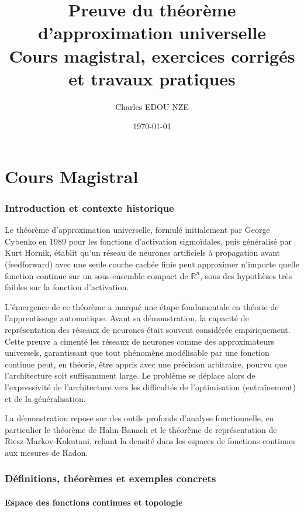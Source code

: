 \documentclass[11pt,a4paper]{article}
\title{\Huge Preuve du théorème d'approximation universelle \\ \large Cours magistral, exercices corrigés et travaux pratiques}
\author{\Large Charles EDOU NZE}
\date{\today}
\begin{document}
\maketitle
\tableofcontents
\newpage

\part{Cours Magistral}

\section{Introduction et contexte historique}

Le théorème d'approximation universelle, formulé initialement par George Cybenko en 1989 pour les fonctions d'activation sigmoïdales, puis généralisé par Kurt Hornik, établit qu'un réseau de neurones artificiels à propagation avant (feedforward) avec une seule couche cachée finie peut approximer n'importe quelle fonction continue sur un sous-ensemble compact de $\mathbb{R}^n$, sous des hypothèses très faibles sur la fonction d'activation.

L'émergence de ce théorème a marqué une étape fondamentale en théorie de l'apprentissage automatique. Avant sa démonstration, la capacité de représentation des réseaux de neurones était souvent considérée empiriquement. Cette preuve a cimenté les réseaux de neurones comme des approximateurs universels, garantissant que tout phénomène modélisable par une fonction continue peut, en théorie, être appris avec une précision arbitraire, pourvu que l'architecture soit suffisamment large. Le problème se déplace alors de l'expressivité de l'architecture vers les difficultés de l'optimisation (entraînement) et de la généralisation.

La démonstration repose sur des outils profonds d'analyse fonctionnelle, en particulier le théorème de Hahn-Banach et le théorème de représentation de Riesz-Markov-Kakutani, reliant la densité dans les espaces de fonctions continues aux mesures de Radon.

\section{Définitions, théorèmes et exemples concrets}

\subsection{Espace des fonctions continues et topologie}
\end{document}
